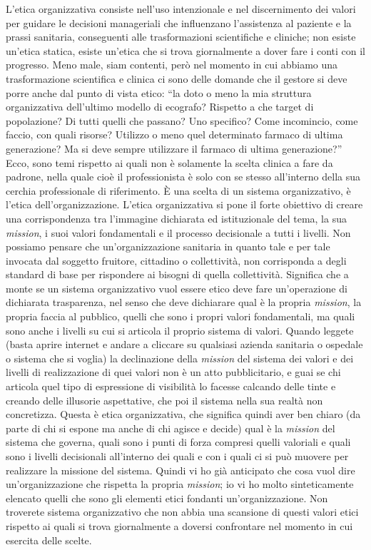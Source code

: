 \documentclass[]{article}
\begin{document}
L'etica organizzativa consiste nell'uso intenzionale e nel discernimento
dei valori per guidare le decisioni manageriali che influenzano
l'assistenza al paziente e la prassi sanitaria, conseguenti alle
trasformazioni scientifiche e cliniche; non esiste un'etica statica,
esiste un'etica che si trova giornalmente a dover fare i conti con il
progresso. Meno male, siam contenti, però nel momento in cui abbiamo una
trasformazione scientifica e clinica ci sono delle domande che il
gestore si deve porre anche dal punto di vista etico: ``la doto o meno
la mia struttura organizzativa dell'ultimo modello di ecografo? Rispetto
a che target di popolazione? Di tutti quelli che passano? Uno specifico?
Come incomincio, come faccio, con quali risorse? Utilizzo o meno quel
determinato farmaco di ultima generazione? Ma si deve sempre utilizzare
il farmaco di ultima generazione?'' Ecco, sono temi rispetto ai quali
non è solamente la scelta clinica a fare da padrone, nella quale cioè il
professionista è solo con se stesso all'interno della sua cerchia
professionale di riferimento. È una scelta di un sistema organizzativo,
è l'etica dell'organizzazione. L'etica organizzativa si pone il forte
obiettivo di creare una corrispondenza tra l'immagine dichiarata ed
istituzionale del tema, la sua \emph{mission}, i suoi valori
fondamentali e il processo decisionale a tutti i livelli. Non possiamo
pensare che un'organizzazione sanitaria in quanto tale e per tale
invocata dal soggetto fruitore, cittadino o collettività, non
corrisponda a degli standard di base per rispondere ai bisogni di quella
collettività. Significa che a monte se un sistema organizzativo vuol
essere etico deve fare un'operazione di dichiarata trasparenza, nel
senso che deve dichiarare qual è la propria \emph{mission}, la propria
faccia al pubblico, quelli che sono i propri valori fondamentali, ma
quali sono anche i livelli su cui si articola il proprio sistema di
valori. Quando leggete (basta aprire internet e andare a cliccare su
qualsiasi azienda sanitaria o ospedale o sistema che si voglia) la
declinazione della \emph{mission} del sistema dei valori e dei livelli
di realizzazione di quei valori non è un atto pubblicitario, e guai se
chi articola quel tipo di espressione di visibilità lo facesse calcando
delle tinte e creando delle illusorie aspettative, che poi il sistema
nella sua realtà non concretizza. Questa è etica organizzativa, che
significa quindi aver ben chiaro (da parte di chi si espone ma anche di
chi agisce e decide) qual è la \emph{mission} del sistema che governa,
quali sono i punti di forza compresi quelli valoriali e quali sono i
livelli decisionali all'interno dei quali e con i quali ci si può
muovere per realizzare la missione del sistema. Quindi vi ho già
anticipato che cosa vuol dire un'organizzazione che rispetta la propria
\emph{mission}; io vi ho molto sinteticamente elencato quelli che sono
gli elementi etici fondanti un'organizzazione. Non troverete sistema
organizzativo che non abbia una scansione di questi valori etici
rispetto ai quali si trova giornalmente a doversi confrontare nel
momento in cui esercita delle scelte.
\end{document}
